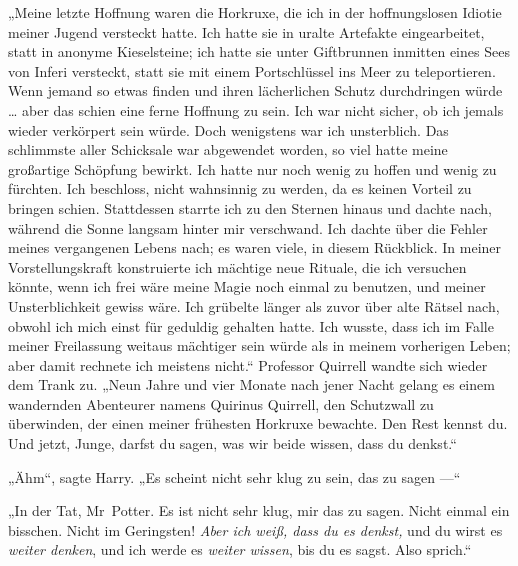 „Meine letzte Hoffnung waren die Horkruxe, die ich in der hoffnungslosen Idiotie meiner Jugend versteckt hatte. Ich hatte sie in uralte Artefakte eingearbeitet, statt in anonyme Kieselsteine; ich hatte sie unter Giftbrunnen inmitten eines Sees von Inferi versteckt, statt sie mit einem Portschlüssel ins Meer zu teleportieren. Wenn jemand so etwas finden und ihren lächerlichen Schutz durchdringen würde … aber das schien eine ferne Hoffnung zu sein. Ich war nicht sicher, ob ich jemals wieder verkörpert sein würde. Doch wenigstens war ich unsterblich. Das schlimmste aller Schicksale war abgewendet worden, so viel hatte meine großartige Schöpfung bewirkt. Ich hatte nur noch wenig zu hoffen und wenig zu fürchten. Ich beschloss, nicht wahnsinnig zu werden, da es keinen Vorteil zu bringen schien. Stattdessen starrte ich zu den Sternen hinaus und dachte nach, während die Sonne langsam hinter mir verschwand. Ich dachte über die Fehler meines vergangenen Lebens nach; es waren viele, in diesem Rückblick. In meiner Vorstellungskraft konstruierte ich mächtige neue Rituale, die ich versuchen könnte, wenn ich frei wäre meine Magie noch einmal zu benutzen, und meiner Unsterblichkeit gewiss wäre. Ich grübelte länger als zuvor über alte Rätsel nach, obwohl ich mich einst für geduldig gehalten hatte. Ich wusste, dass ich im Falle meiner Freilassung weitaus mächtiger sein würde als in meinem vorherigen Leben; aber damit rechnete ich meistens nicht.“
Professor Quirrell wandte sich wieder dem Trank zu.
„Neun Jahre und vier Monate nach jener Nacht gelang es einem wandernden Abenteurer namens Quirinus Quirrell, den Schutzwall zu überwinden, der einen meiner frühesten Horkruxe bewachte. Den Rest kennst du. Und jetzt, Junge, darfst du sagen, was wir beide wissen, dass du denkst.“

„Ähm“, sagte Harry.
„Es scheint nicht sehr klug zu sein, das zu sagen —“

„In der Tat, Mr~Potter. Es ist nicht sehr klug, mir das zu sagen. Nicht einmal ein bisschen. Nicht im Geringsten! \emph{Aber ich weiß, dass du es denkst,} und du wirst es \emph{weiter denken}, und ich werde es \emph{weiter wissen}, bis du es sagst. Also sprich.“

